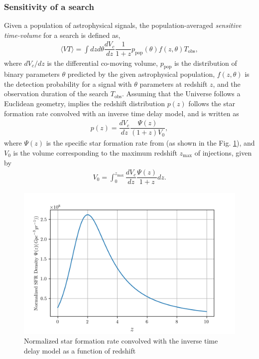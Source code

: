 \subsubsection{Sensitivity of a search}
Given a population of astrophysical signals, the population-averaged \textit{sensitive time-volume} for a search is defined as,
\begin{align}
    \langle VT \rangle = \int dz d\theta \dfrac{dV_c}{dz}\dfrac{1}{1+z}p_{\text{pop}}(\theta) f(z,\theta)T_{\text{obs}},
    \label{Eq:Sensitive-VT-generic}
\end{align}
where $dV_c/dz$ is the differential co-moving volume, $p_{\text{pop}}$ is the distribution of binary parameters $\theta$ predicted by the given astrophysical population, $f(z, \theta)$ is the detection probability for a signal with $\theta$ parameters at redshift $z$, and the observation duration of the search $T_{\text{obs}}$. Assuming that the Universe follows a Euclidean geometry, implies the redshift distribution $p(z)$ follows the star formation rate convolved with an inverse time delay model, and is written as 
\begin{align}
    p(z) = \dfrac{dV_c}{dz} \dfrac{\Psi(z)}{(1+z)V_0},
\end{align}
where $\Psi(z)$ is the specific star formation rate from \cite{Madau:2016jbv} (as shown in the Fig. \ref{fig:SFR}), and $V_0$ is the volume corresponding to the maximum redshift $z_{\max}$ of injections, given by
\begin{align}
    V_0 = \int_0^{z_{\max}} \dfrac{dV_c}{dz} \dfrac{\Psi(z)}{1+z} dz.
\end{align}
\begin{figure}
    \centering
    \includegraphics[width=0.8\linewidth]{figures/basic_data_analysis/SFR.png}
    \caption{Normalized star formation rate convolved with the inverse time delay model as a function of redshift \cite{Madau:2016jbv}}
    \label{fig:SFR}
\end{figure}

